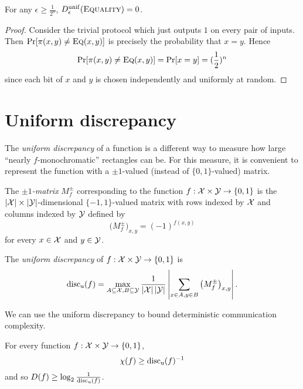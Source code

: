 \begin{theorem}
For any $\epsilon \ge \frac1{2^n}$, $D_\epsilon^{\mathrm{unif}}(\textsc{Equality}) = 0$.
\end{theorem}

\begin{proof}
Consider the trivial protocol which just outputs $1$ on every pair of inputs. Then $\Pr[\pi(x,y)\neq \textsc{Eq}(x,y)]$ is precisely the probability that $x=y$. Hence
$$\Pr[\pi(x,y)\neq \textsc{Eq}(x,y)] = \Pr[x=y] = (\frac{1}{2})^n$$
since each bit of $x$ and $y$ is chosen independently and uniformly at random.
\end{proof}


\newpage \section{Uniform discrepancy}

The \emph{uniform discrepancy} of a function is a different way to measure how large ``nearly $f$-monochromatic'' rectangles can be. For this measure, it is convenient to represent the function with a $\pm1$-valued (instead of $\{0,1\}$-valued) matrix.

\begin{definition}
The \emph{$\pm 1$-matrix} $M^\pm_f$ corresponding to the function $f : \mathcal{X} \times \mathcal{Y} \to \{0,1\}$ is the $|\mathcal{X}| \times |\mathcal{Y}|$-dimensional $\{-1,1\}$-valued matrix with rows indexed by $\mathcal{X}$ and columns indexed by $\mathcal{Y}$ defined by
\[
\big(M^{\pm}_f\big)_{x,y} = (-1)^{f(x,y)}
\]
for every $x \in \mathcal{X}$ and $y \in \mathcal{Y}$.
\end{definition}

\begin{definition}
The \emph{uniform discrepancy} of $f : \mathcal{X} \times \mathcal{Y} \to \{0,1\}$ is
\[
\mathrm{disc_u}(f) = \max_{A \subseteq \mathcal{X}, B \subseteq \mathcal{Y}} \frac{1}{|\mathcal{X}| \, |\mathcal{Y}|} \left| \sum_{x \in A, y \in B} \big(M^{\pm}_f\big)_{x,y} \right|.
\]
\end{definition}

We can use the uniform discrepancy to bound deterministic communication complexity.

\begin{theorem}
For every function $f : \mathcal{X} \times \mathcal{Y} \to \{0,1\}$,
\[
\chi(f) \ge \mathrm{disc_u}(f)^{-1}
\] 
and so $D(f) \ge \log_2 \frac1{\mathrm{disc_u}(f)}$.
\end{theorem}

